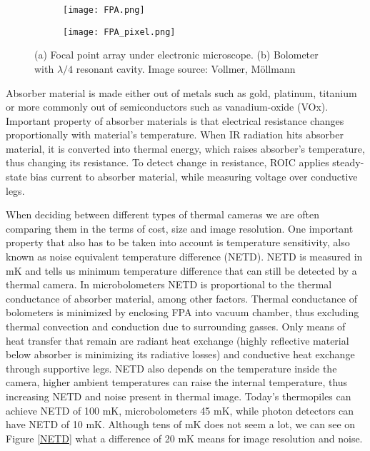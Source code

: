 \begin{figure}[h]
    \begin{subfigure}{0.5\textwidth}
        \centering
        \texttt{[image: FPA.png]} 
        \caption{}
        \label{FPA}
    \end{subfigure}
    \begin{subfigure}{0.5\textwidth}
        \centering
        \texttt{[image: FPA\_pixel.png]}
        \caption{}
        \label{FPA_pixel}
    \end{subfigure}

    \caption{(a) Focal point array under electronic microscope. (b) Bolometer with $\lambda /4$ resonant cavity. Image source: Vollmer, Möllmann\cite{thermal_book}}
    \label{FPA_microbolo}
\end{figure}

Absorber material is made either out of metals such as gold, platinum, titanium or more commonly out of semiconductors such as vanadium-oxide (VOx)\cite{thermal_article}.
Important property of absorber materials is that electrical resistance changes proportionally with material's temperature\cite{thermal_book}.
When IR radiation hits absorber material, it is converted into thermal energy, which raises absorber's temperature, thus changing its resistance.
To detect change in resistance, ROIC applies steady-state bias current to absorber material, while measuring voltage over conductive legs\cite{thermal_book}. 

When deciding between different types of thermal cameras we are often comparing them in the terms of cost, size and image resolution.
One important property that also has to be taken into account is temperature sensitivity, also known as noise equivalent temperature difference (NETD).
NETD is measured in \si{\milli\kelvin} and tells us minimum temperature difference that can still be detected by a thermal camera.
In microbolometers NETD is proportional to the thermal conductance of absorber material, among other factors\cite{thermal_book}.
Thermal conductance of bolometers is minimized by enclosing FPA into vacuum chamber, thus excluding thermal convection and conduction due to surrounding gasses.
Only means of heat transfer that remain are radiant heat exchange (highly reflective material below absorber is minimizing its radiative losses) and conductive heat exchange through supportive legs.
NETD also depends on the temperature inside the camera, higher ambient temperatures can raise the internal temperature, thus increasing NETD and noise present in thermal image.
Today's thermopiles can achieve NETD of 100 \si{\milli\kelvin}, microbolometers 45 \si{\milli\kelvin}, while photon detectors can have NETD of 10 \si{\milli\kelvin}.
Although tens of \si{\milli\kelvin} does not seem a lot, we can see on Figure \ref{NETD} what a difference of 20 \si{\milli\kelvin} means for image resolution and noise.
\newline

